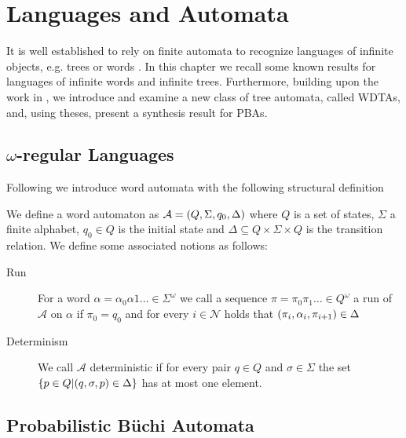 \chapter{Languages and Automata}
It is well established to rely on finite automata to recognize languages of
infinite objects, e.g. trees or words \cite{LangAutoLog}. In this chapter we
recall some known results for languages of infinite words and infinite trees.
Furthermore, building upon the work in \cite{RandAutoInfTrees}, we introduce and
examine a new class of tree automata, called \aclp*{WDTA}, and, using theses,
present a synthesis result for \aclp*{PBA}.

\section{$\omega$-regular Languages}
Following \cite{LangAutoLog} we introduce word automata with the following
structural definition
\begin{definition}
  We define a word automaton as
  $\mathcal{A} = \left(Q, \Sigma, q_{0}, \Delta\right)$ where
  $Q$ is a set of states, $\Sigma$ a finite alphabet, $q_{0}\in Q$ is the
  initial state and $\Delta\subseteq Q\times\Sigma\times Q$ is the transition
  relation. We define some associated notions as follows:
  \begin{description}
    \item [Run]
      For a word $\alpha = \alpha_{0}\alpha{1}\dots\in\Sigma^{\omega}$ we call
      a sequence $\pi = \pi_{0}\pi_{1}\dots \in Q^{\omega}$ a run of
      $\mathcal{A}$ on $\alpha$ if $\pi_{0} = q_{0}$ and for every
      $i\in\mathcal{N}$ holds that
      $\left(\pi_{i}, \alpha_{i}, \pi_{i+1}\right)\in\Delta$
    \item [Determinism]
      We call $\mathcal{A}$ deterministic if for every pair $q\in Q$ and
      $\sigma\in\Sigma$ the set
      $\left\{p\in Q\middle| \left(q,\sigma,p\right)\in\Delta\right\}$ has at most one
      element.
  \end{description}
\end{definition}

\section{Probabilistic Büchi Automata}

